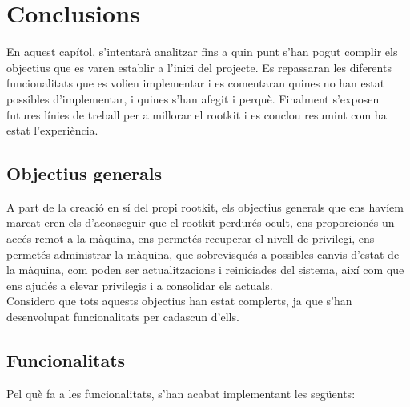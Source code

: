\chapter{Conclusions}

En aquest capítol, s'intentarà analitzar fins a quin punt s'han pogut complir els objectius que es varen 
establir a l'inici del projecte. Es repassaran les diferents funcionalitats que es volien implementar 
i es comentaran quines no han estat possibles d'implementar, i quines s'han afegit i perquè. Finalment
s'exposen futures línies de treball per a millorar el rootkit i es conclou resumint com ha estat 
l'experiència. \\

\section{Objectius generals}

A part de la creació en sí del propi rootkit, els objectius generals que ens havíem marcat eren els 
d'aconseguir que el rootkit perdurés ocult, ens proporcionés un accés remot a la màquina, ens permetés 
recuperar el nivell de privilegi, ens permetés administrar la màquina, que sobrevisqués a possibles 
canvis d'estat de la màquina, com poden ser actualitzacions i reiniciades del sistema, així com que 
ens ajudés a elevar privilegis i a consolidar els actuals. \\

Considero que tots aquests objectius han estat complerts, ja que s'han desenvolupat funcionalitats 
per cadascun d'ells.  \\

\section{Funcionalitats}

Pel què fa a les funcionalitats, s'han acabat implementant les següents:

